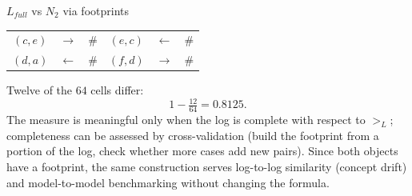 \begin{examplebox}{$L_{full}$ vs $N_2$ via footprints}
\begin{center}
\begin{tabular}{ccc@{\qquad}ccc}
$(c,e)$ & $\to$ & $\#$ & $(e,c)$ & $\leftarrow$ & $\#$ \\
$(d,a)$ & $\leftarrow$ & $\#$ & $(f,d)$ & $\to$ & $\#$ \\
\bottomrule
\end{tabular}
\end{center}
Twelve of the $64$ cells differ:
\[1 - \tfrac{12}{64} = 0.8125.\]
The measure is meaningful only when the log is complete with respect to $>_L$; completeness can be assessed by cross-validation (build the footprint from a portion of the log, check whether more cases add new pairs). Since both objects have a footprint, the same construction serves log-to-log similarity (concept drift) and model-to-model benchmarking without changing the formula.
\end{examplebox}
